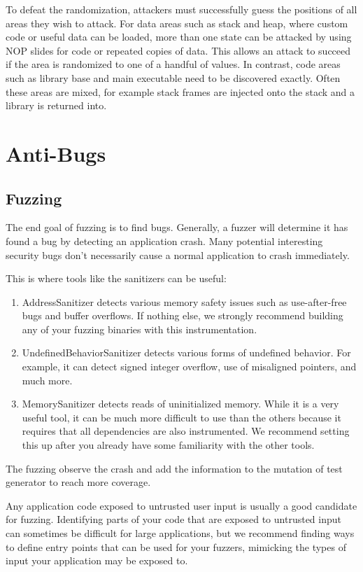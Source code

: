 \documentclass[a4paper]{exam}
\theoremstyle{definition}
\begin{document}
To defeat the randomization, attackers must successfully guess the positions of all areas they wish to attack. For data areas such as stack and heap, where custom code or useful data can be loaded, more than one state can be attacked by using NOP slides for code or repeated copies of data. This allows an attack to succeed if the area is randomized to one of a handful of values. In contrast, code areas such as library base and main executable need to be discovered exactly. Often these areas are mixed, for example stack frames are injected onto the stack and a library is returned into.
\section{Anti-Bugs}
\subsection{Fuzzing\cite{introfuzzing}}
The end goal of fuzzing is to find bugs. Generally, a fuzzer will determine it has found a bug by detecting an application crash. Many potential interesting security bugs don’t necessarily cause a normal application to crash immediately.

This is where tools like the sanitizers can be useful:
\begin{enumerate}
    \item AddressSanitizer detects various memory safety issues such as use-after-free bugs and buffer overflows. If nothing else, we strongly recommend building any of your fuzzing binaries with this instrumentation.
    \item UndefinedBehaviorSanitizer detects various forms of undefined behavior. For example, it can detect signed integer overflow, use of misaligned pointers, and much more.
    \item MemorySanitizer detects reads of uninitialized memory. While it is a very useful tool, it can be much more difficult to use than the others because it requires that all dependencies are also instrumented. We recommend setting this up after you already have some familiarity with the other tools.
\end{enumerate}

The fuzzing observe the crash and add the information to the mutation of test generator to reach more coverage. 

Any application code exposed to untrusted user input is usually a good candidate for fuzzing. Identifying parts of your code that are exposed to untrusted input can sometimes be difficult for large applications, but we recommend finding ways to define entry points that can be used for your fuzzers, mimicking the types of input your application may be exposed to.
\end{document}
